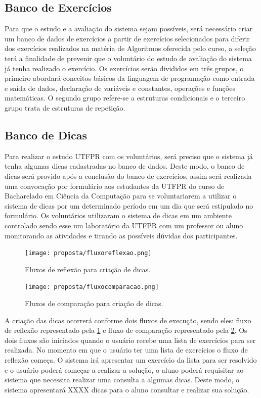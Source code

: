 \subsection{Banco de Exercícios}

Para que o estudo e a avaliação do sistema sejam possíveis, será necessário criar um banco de dados de exercícios a partir de exercícios selecionados para diferir dos exercícios realizados na matéria de Algoritmos oferecida pelo curso, a seleção terá a finalidade de prevenir que o voluntário do estudo de avaliação do sistema já tenha realizado o exercício. Os exercícios serão divididos em três grupos, o primeiro abordará conceitos básicos da linguagem de programação como entrada e saída de dados, declaração de variáveis e constantes, operações e funções matemáticas. O segundo grupo refere-se a estruturas condicionais e o terceiro grupo trata de estruturas de repetição.

\subsection{Banco de Dicas}

Para realizar o estudo UTFPR com os voluntários, será preciso que o sistema já tenha algumas dicas cadastradas no banco de dados. Deste modo, o banco de dicas será provido após a conclusão do banco de exercícios, assim será realizada uma convocação por formulário  aos estudantes da UTFPR do curso de Bacharelado em Ciência da Computação para se voluntariarem a utilizar o sistema de dicas por um determinado período em um dia que será estipulado no formulário. Os voluntários utilizaram o sistema de dicas em um ambiente controlado sendo esse um laboratório da UTFPR com um professor ou aluno monitorando as atividades e tirando as possíveis dúvidas dos participantes. 

\begin{figure}[]
	\centering
	\captionsetup{justification=centering}
	\texttt{[image: proposta/fluxoreflexao.png]}
	\caption{Fluxos de reflexão para criação de dicas.}
	\label{figura:fluxoreflexao}
\end{figure}

\begin{figure}[]
	\centering
	\captionsetup{justification=centering}
	\texttt{[image: proposta/fluxocomparacao.png]}
	\caption{Fluxos de comparação para criação de dicas.}
	\label{figura:fluxocomparacao}
\end{figure}

A criação das dicas ocorrerá conforme dois fluxos de execução, sendo eles: fluxo de reflexão representado pela \cref{figura:fluxoreflexao} e fluxo de comparação representado pela \cref{figura:fluxocomparacao}. Os dois fluxos são iniciados quando o usuário recebe uma lista de exercícios para ser realizada. No momento em que o usuário ter uma lista de exercícios o fluxo de reflexão começa. O sistema irá apresentar um exercício da lista para ser resolvido e o usuário poderá começar a realizar a solução, o aluno poderá requisitar ao sistema que necessita realizar uma consulta a algumas dicas. Deste modo, o sistema apresentará XXXX dicas para o aluno consultar e realizar sua solução.

